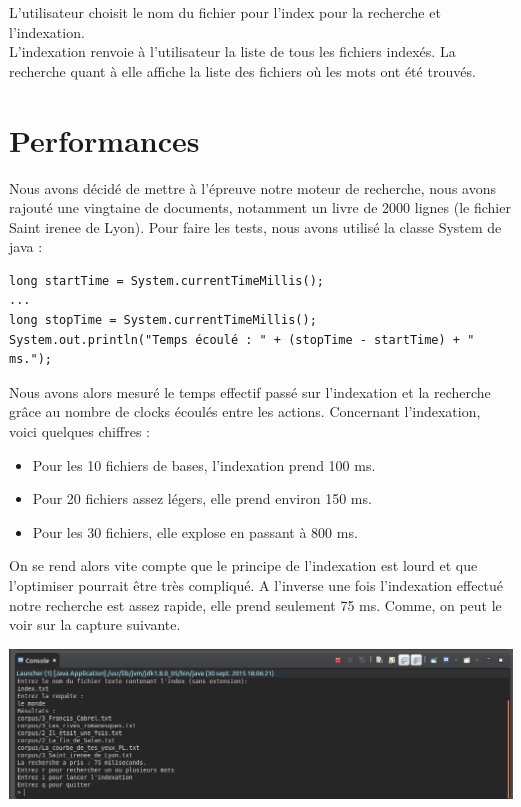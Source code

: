 \documentclass{article}
\begin{document}
L'utilisateur choisit le nom du fichier pour l'index pour la recherche et l'indexation.\\
L'indexation renvoie à l'utilisateur la liste de tous les fichiers indexés. La recherche quant à elle affiche la liste des fichiers où les mots ont été trouvés.

\section{Performances}

Nous avons décidé de mettre à l'épreuve notre moteur de recherche, nous avons rajouté une vingtaine de documents, notamment un livre de 2000 lignes (le fichier Saint irenee de Lyon). 
Pour faire les tests, nous avons utilisé la classe System de java :

\begin{lstlisting}
long startTime = System.currentTimeMillis();
...
long stopTime = System.currentTimeMillis();
System.out.println("Temps écoulé : " + (stopTime - startTime) + " ms.");
\end{lstlisting}

Nous avons alors mesuré le temps effectif passé sur l'indexation et la recherche grâce au nombre de clocks écoulés
entre les actions. Concernant l'indexation, voici quelques chiffres :
\begin{itemize}
	\item Pour les 10 fichiers de bases, l'indexation prend 100 ms.  
	\item Pour 20 fichiers assez légers, elle prend environ 150 ms. 
	\item Pour les 30 fichiers, elle explose en passant à 800 ms.
\end{itemize}

On se rend alors vite compte que le principe de l'indexation est lourd et que l'optimiser pourrait être très 
compliqué. A l'inverse une fois l'indexation effectué notre recherche est assez rapide, elle prend seulement 75 ms. Comme, on peut le voir sur la capture suivante.

\begin{center}
	\includegraphics[scale=0.4]{../data/recherche.png}
\end{center}
\end{document}
